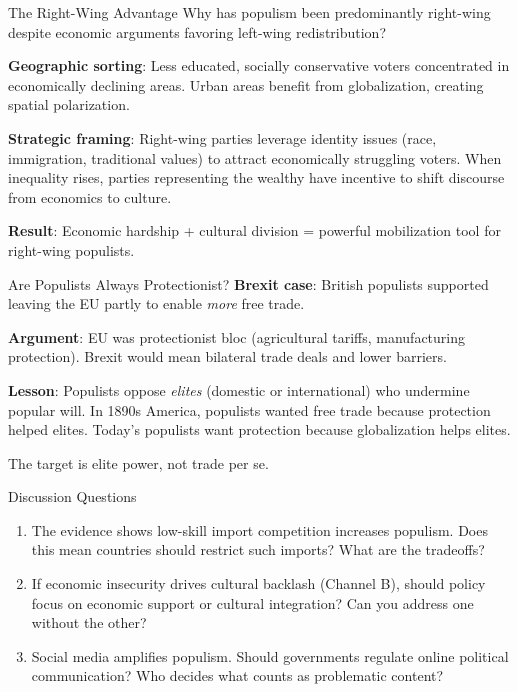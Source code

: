 \documentclass{beamer}
\begin{document}
\begin{frame}{The Right-Wing Advantage}
Why has populism been predominantly right-wing despite economic arguments favoring left-wing redistribution?
\vspace{0.3cm}

\textbf{Geographic sorting}: Less educated, socially conservative voters concentrated in economically declining areas. Urban areas benefit from globalization, creating spatial polarization.
\vspace{0.3cm}

\textbf{Strategic framing}: Right-wing parties leverage identity issues (race, immigration, traditional values) to attract economically struggling voters. When inequality rises, parties representing the wealthy have incentive to shift discourse from economics to culture.
\vspace{0.3cm}

\textbf{Result}: Economic hardship + cultural division = powerful mobilization tool for right-wing populists.
\end{frame}

\begin{frame}{Are Populists Always Protectionist?}
\textbf{Brexit case}: British populists supported leaving the EU partly to enable \textit{more} free trade.
\vspace{0.3cm}

\textbf{Argument}: EU was protectionist bloc (agricultural tariffs, manufacturing protection). Brexit would mean bilateral trade deals and lower barriers.
\vspace{0.3cm}

\textbf{Lesson}: Populists oppose \textit{elites} (domestic or international) who undermine popular will. In 1890s America, populists wanted free trade because protection helped elites. Today's populists want protection because globalization helps elites.
\vspace{0.3cm}

The target is elite power, not trade per se.
\end{frame}


\begin{frame}{Discussion Questions}
\begin{enumerate}
    \item The evidence shows low-skill import competition increases populism. Does this mean countries should restrict such imports? What are the tradeoffs?
    \vspace{0.3cm}
    \item If economic insecurity drives cultural backlash (Channel B), should policy focus on economic support or cultural integration? Can you address one without the other?
    \vspace{0.3cm}
    \item Social media amplifies populism. Should governments regulate online political communication? Who decides what counts as problematic content?
\end{enumerate}
\end{frame}
\end{document}
